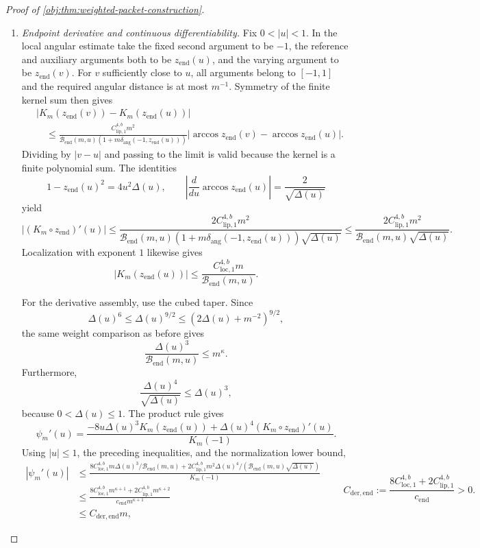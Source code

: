 \begin{proof}[Proof of \cref{obj:thm:weighted-packet-construction}]
\begin{enumerate}
\item \emph{Endpoint derivative and continuous differentiability.}
Fix \(0<|u|<1\). In the local angular estimate take the fixed second argument to be \(-1\), the reference and auxiliary arguments both to be \(z_{\mathrm{end}}(u)\), and the varying argument to be \(z_{\mathrm{end}}(v)\). For \(v\) sufficiently close to \(u\), all arguments belong to \([-1,1]\) and the required angular distance is at most \(m^{-1}\). Symmetry of the finite kernel sum then gives
\[
\begin{split}
&|K_m(z_{\mathrm{end}}(v))-K_m(z_{\mathrm{end}}(u))|\\
&\quad\le
\frac{C_{\mathrm{lip},1}^{4,b}m^2}
{\mathcal B_{\mathrm{end}}(m,u)
 (1+m\delta_{\mathrm{ang}}(-1,z_{\mathrm{end}}(u)))}
|\arccos z_{\mathrm{end}}(v)-\arccos z_{\mathrm{end}}(u)|.
\end{split}
\]
Dividing by \(|v-u|\) and passing to the limit is valid because the kernel is a finite polynomial sum. The identities
\[
1-z_{\mathrm{end}}(u)^2=4u^2\Delta(u),
\qquad
\left|\frac{d}{du}\arccos z_{\mathrm{end}}(u)\right|
=\frac2{\sqrt{\Delta(u)}}
\]
yield
\[
|(K_m\circ z_{\mathrm{end}})'(u)|
\le
\frac{2C_{\mathrm{lip},1}^{4,b}m^2}
{\mathcal B_{\mathrm{end}}(m,u)
 (1+m\delta_{\mathrm{ang}}(-1,z_{\mathrm{end}}(u)))
 \sqrt{\Delta(u)}}
\le
\frac{2C_{\mathrm{lip},1}^{4,b}m^2}
{\mathcal B_{\mathrm{end}}(m,u)\sqrt{\Delta(u)}}.
\]
Localization with exponent \(1\) likewise gives
\[
|K_m(z_{\mathrm{end}}(u))|
\le
\frac{C_{\mathrm{loc},1}^{4,b}m}
{\mathcal B_{\mathrm{end}}(m,u)}.
\]

For the derivative assembly, use the cubed taper. Since
\[
\Delta(u)^6
\le\Delta(u)^{9/2}
\le(2\Delta(u)+m^{-2})^{9/2},
\]
the same weight comparison as before gives
\[
\frac{\Delta(u)^3}{\mathcal B_{\mathrm{end}}(m,u)}
\le m^\kappa.
\]
Furthermore,
\[
\frac{\Delta(u)^4}{\sqrt{\Delta(u)}}\le\Delta(u)^3,
\]
because \(0<\Delta(u)\le1\). The product rule gives
\[
\psi_m'(u)=
\frac{-8u\Delta(u)^3K_m(z_{\mathrm{end}}(u))
+\Delta(u)^4(K_m\circ z_{\mathrm{end}})'(u)}
{K_m(-1)}.
\]
Using \(|u|\le1\), the preceding inequalities, and the normalization lower bound,
\[
\begin{split}
|\psi_m'(u)|
&\le
\frac{
8C_{\mathrm{loc},1}^{4,b}m
 \Delta(u)^3/\mathcal B_{\mathrm{end}}(m,u)
+
2C_{\mathrm{lip},1}^{4,b}m^2
 \Delta(u)^4/(\mathcal B_{\mathrm{end}}(m,u)\sqrt{\Delta(u)})
}{K_m(-1)}\\
&\le
\frac{8C_{\mathrm{loc},1}^{4,b}m^{\kappa+1}
      +2C_{\mathrm{lip},1}^{4,b}m^{\kappa+2}}
     {c_{\mathrm{end}}m^{\kappa+1}}\\
&\le C_{\mathrm{der,end}}m,
\end{split}
\qquad
C_{\mathrm{der,end}}
:=
\frac{8C_{\mathrm{loc},1}^{4,b}
      +2C_{\mathrm{lip},1}^{4,b}}{c_{\mathrm{end}}}>0.
\]


\end{enumerate}
\end{proof}
